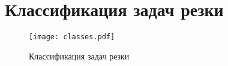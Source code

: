 
\section{Классификация задач резки}
\label{sec:cut.class}

\begin{figure}
  \centering
  \texttt{[image: classes.pdf]}
  \caption{Классификация задач резки}
  \label{fig:cut-classes}
\end{figure}

